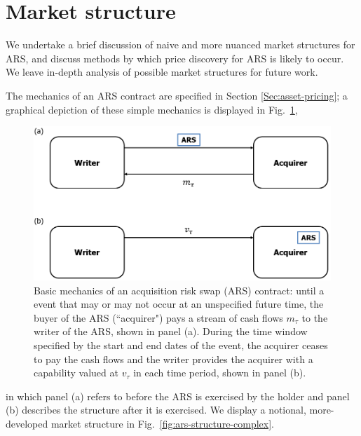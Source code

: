 \documentclass{article}
\begin{document}
\section{Market structure}\label{sec:market-structure-overview}

We undertake a brief discussion of naive and more nuanced market structures for ARS, and discuss methods by which price discovery for ARS is likely to occur.
We leave in-depth analysis of possible market structures for future work.

The mechanics of an ARS contract are specified in Section \ref{Sec:asset-pricing}; a graphical depiction of these simple mechanics is displayed in Fig.\ \ref{fig:ars-structure-simple},
\begin{figure}
    \centering
    \includegraphics[width=\linewidth]{ars-structure-simple.png}
    \caption{Basic mechanics of an acquisition risk swap (ARS) contract: until a event that may or may not occur at an unspecified future time, the buyer of the ARS (``acquirer") pays a stream of cash flows $m_\tau$ to the writer of the ARS, shown in panel (a).
    During the time window specified by the start and end dates of the event, the acquirer ceases to pay the cash flows and the writer provides the acquirer with a capability valued at $v_\tau$ in each time period, shown in panel (b).
    }
    \label{fig:ars-structure-simple}
\end{figure}
in which panel (a) refers to before the ARS is exercised by the holder and panel (b) describes the structure after it is exercised.
We display a notional, more-developed market structure in Fig.\ \ref{fig:ars-structure-complex}.
\end{document}
